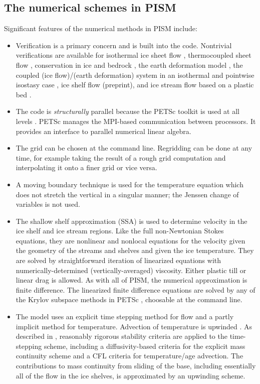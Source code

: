 \documentclass[11pt,final]{amsart}
\begin{document}
\subsection{The numerical schemes in PISM}  Significant features of the numerical methods in PISM include:\begin{itemize}
\item Verification \cite{Roache} is a primary concern and is built into the code.  Nontrivial verifications are available for isothermal ice sheet flow \cite{BLKCB}, thermocoupled sheet flow \cite{BB,BBL}, conservation in ice and bedrock \cite{BuelerTestK}, the earth deformation model \cite{BLKfastearth}, the coupled (ice flow)/(earth deformation) system in an isothermal and pointwise isostasy  case \cite{BLKfastearth}, ice shelf flow (preprint), and ice stream flow based on a plastic bed \cite{SchoofStream}.
\item The code is \emph{structurally} parallel because the PETSc toolkit is used at all levels \cite{petsc-user-ref}.  PETSc manages the MPI-based communication between processors.  It provides an interface to parallel numerical linear algebra.
\item The grid can be chosen at the command line.  Regridding can be done at any time, for example taking the result of a rough grid computation and interpolating it onto a finer grid or vice versa.
\item A moving boundary technique is used for the temperature equation which does not stretch the vertical in a singular manner; the Jenssen \cite{Jenssen} change of variables is not used.
\item The shallow shelf approximation (SSA) \cite{WeisGreveHutter} is used to determine velocity in the ice shelf and ice stream regions.  Like the full non-Newtonian Stokes equations, they are nonlinear and nonlocal equations for the velocity given the geometry of the streams and shelves and given the ice temperature.  They are solved by straightforward iteration of linearized equations with numerically-determined (vertically-averaged) viscosity.  Either plastic till or linear drag is allowed.  As with all of PISM, the numerical approximation is finite difference.  The linearized finite difference equations are solved by any of the Krylov subspace methods in PETSc \cite{petsc-user-ref}, choosable at the command line.
\item The model uses an explicit time stepping method for flow and a partly implicit method for temperature.  Advection of temperature is upwinded \cite{MortonMayers}.  As described  in  \cite{BBL}, reasonably rigorous stability criteria are applied to the time-stepping scheme, including a diffusivity-based criteria for the explicit mass continuity scheme and a CFL criteria \cite{MortonMayers} for temperature/age advection.  The contributions to mass continuity from sliding of the base, including essentially all of the flow in the ice shelves, is approximated by an upwinding scheme.

\end{itemize}
\end{document}
